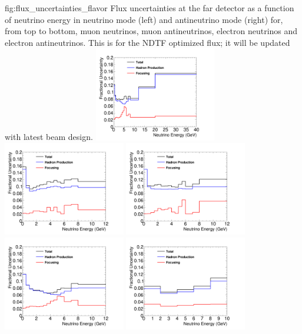\begin{dunefigure}{fig:flux_uncertainties_flavor}
{Flux uncertainties at the far detector as a function of neutrino energy in neutrino mode (left) and antineutrino mode (right) for, from top to bottom, muon neutrinos, muon antineutrinos, electron neutrinos and electron antineutrinos.   This is for the NDTF optimized flux; it will  be updated with latest beam design.   }
    \includegraphics[width=0.4\textwidth]{graphics/error_overlay_numu_neutrino_FD_opt.png}
    \includegraphics[width=0.4\textwidth]{graphics/error_overlay_numu_antineutrino_FD_opt.png}
    \includegraphics[width=0.4\textwidth]{graphics/error_overlay_numubar_neutrino_FD_opt.png}
    \includegraphics[width=0.4\textwidth]{graphics/error_overlay_numubar_antineutrino_FD_opt.png}
        \includegraphics[width=0.4\textwidth]{graphics/error_overlay_nue_neutrino_FD_opt.png}

\end{dunefigure}
